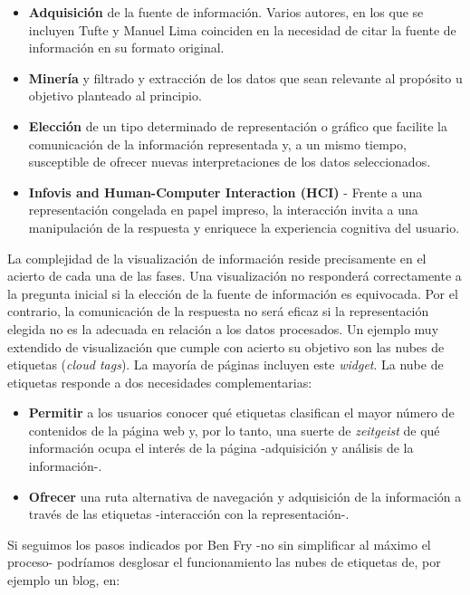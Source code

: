 \documentclass[12pt, a4paper,twoside]{book}
\begin{document}
\begin{itemize}
\item
  \textbf{Adquisición} de la fuente de información. Varios autores,
  en los que se incluyen Tufte y Manuel Lima coinciden en la
  necesidad de citar la fuente de información en su formato original.
\item
  \textbf{Minería} y filtrado y extracción de los datos que sean
  relevante al propósito u objetivo planteado al principio.
\item
  \textbf{Elección} de un tipo determinado de representación o
  gráfico que facilite la comunicación de la información representada
  y, a un mismo tiempo, susceptible de ofrecer nuevas
  interpretaciones de los datos seleccionados.
\item
  \textbf{Infovis and Human-Computer Interaction (HCI)} - Frente a
  una representación congelada en papel impreso, la interacción
  invita a una manipulación de la respuesta y enriquece la
  experiencia cognitiva del usuario.
\end{itemize}
La complejidad de la visualización de información reside
precisamente en el acierto de cada una de las fases. Una
visualización no responderá correctamente a la pregunta inicial si
la elección de la fuente de información es equivocada. Por el
contrario, la comunicación de la respuesta no será eficaz si la
representación elegida no es la adecuada en relación a los datos
procesados. Un ejemplo muy extendido de visualización que cumple
con acierto su objetivo son las nubes de etiquetas
(\emph{cloud tags}). La mayoría de páginas incluyen este
\emph{widget}. La nube de etiquetas responde a dos necesidades
complementarias:

\begin{itemize}
\item
  \textbf{Permitir} a los usuarios conocer qué etiquetas clasifican
  el mayor número de contenidos de la página web y, por lo tanto, una
  suerte de \emph{zeitgeist} de qué información ocupa el interés de
  la página -adquisición y análisis de la información-.
\item
  \textbf{Ofrecer} una ruta alternativa de navegación y adquisición
  de la información a través de las etiquetas -interacción con la
  representación-.
\end{itemize}
Si seguimos los pasos indicados por Ben Fry -no sin simplificar al
máximo el proceso- podríamos desglosar el funcionamiento las nubes
de etiquetas de, por ejemplo un blog, en:
\end{document}
